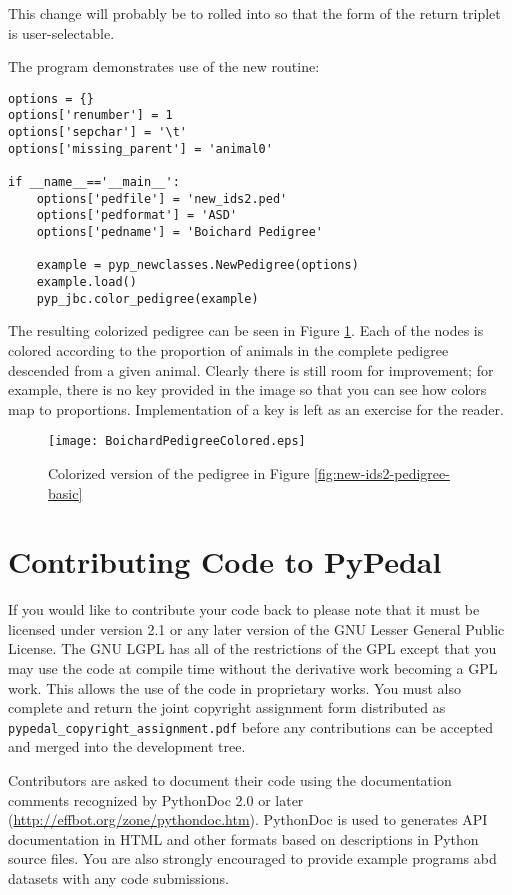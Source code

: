 This change will probably be to rolled into  so that the form of the return triplet is user-selectable.

The program  demonstrates use of the new  routine:
\begin{verbatim}
options = {}
options['renumber'] = 1
options['sepchar'] = '\t'
options['missing_parent'] = 'animal0'

if __name__=='__main__':
    options['pedfile'] = 'new_ids2.ped'
    options['pedformat'] = 'ASD'
    options['pedname'] = 'Boichard Pedigree'

    example = pyp_newclasses.NewPedigree(options)
    example.load()
    pyp_jbc.color_pedigree(example)
\end{verbatim}
The resulting colorized pedigree can be seen in Figure \ref{fig:boichard2-pedigree-colorized}.  Each of the nodes is colored
according to the proportion of animals in the complete pedigree descended from a given animal.  Clearly there is still room
for improvement; for example, there is no key provided in the image so that you can see how colors map to proportions.  Implementation
of a key is left as an exercise for the reader.
\begin{figure}
  \begin{center}
    \texttt{[image: BoichardPedigreeColored.eps]}
    \caption{Colorized version of the pedigree in Figure \ref{fig:new-ids2-pedigree-basic}}
    \label{fig:boichard2-pedigree-colorized}
  \end{center}
\end{figure}
\section{Contributing Code to PyPedal}
\label{sec:newfeatures-overview-contributing-code}
If you would like to contribute your code back to \PyPedal{} please note that it must be licensed under version 2.1 or any
later version of the GNU Lesser General Public License.  The GNU LGPL has all of the restrictions of the GPL except that you
may use the code at compile time without the derivative work becoming a GPL work. This allows the use of the code in
proprietary works.  You must also complete and return the joint copyright assignment form distributed as
\texttt{pypedal\_copyright\_assignment.pdf} before any contributions can be accepted and merged into the development tree.

Contributors are asked to document their code using the documentation comments recognized by PythonDoc 2.0 or later
(\url{http://effbot.org/zone/pythondoc.htm}).  PythonDoc is used to generates API documentation in HTML and other formats
based on descriptions in Python source files.  You are also strongly encouraged to provide example programs abd datasets
with any code submissions.